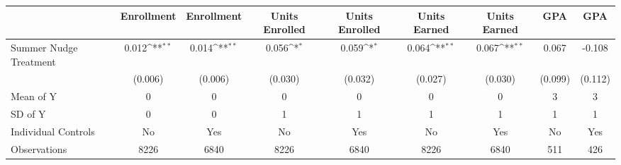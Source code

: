 {
\def\sym#1{\ifmmode^{#1}\else\(^{#1}\)\fi}
\begin{tabular}{l*{8}{c}}
\toprule
                    &\multicolumn{1}{c}{Enrollment}&\multicolumn{1}{c}{Enrollment}&\multicolumn{1}{c}{Units Enrolled}&\multicolumn{1}{c}{Units Enrolled}&\multicolumn{1}{c}{Units Earned}&\multicolumn{1}{c}{Units Earned}&\multicolumn{1}{c}{GPA}&\multicolumn{1}{c}{GPA}\\
\midrule
Summer Nudge Treatment&       0.012\sym{**} &       0.014\sym{**} &       0.056\sym{*}  &       0.059\sym{*}  &       0.064\sym{**} &       0.067\sym{**} &       0.067         &      -0.108         \\
                    &     (0.006)         &     (0.006)         &     (0.030)         &     (0.032)         &     (0.027)         &     (0.030)         &     (0.099)         &     (0.112)         \\
\midrule
Mean of Y           &           0         &           0         &           0         &           0         &           0         &           0         &           3         &           3         \\
SD of Y             &           0         &           0         &           1         &           1         &           1         &           1         &           1         &           1         \\
Individual Controls &          No         &         Yes         &          No         &         Yes         &          No         &         Yes         &          No         &         Yes         \\
Observations        &        8226         &        6840         &        8226         &        6840         &        8226         &        6840         &         511         &         426         \\
\bottomrule
\end{tabular}
}
